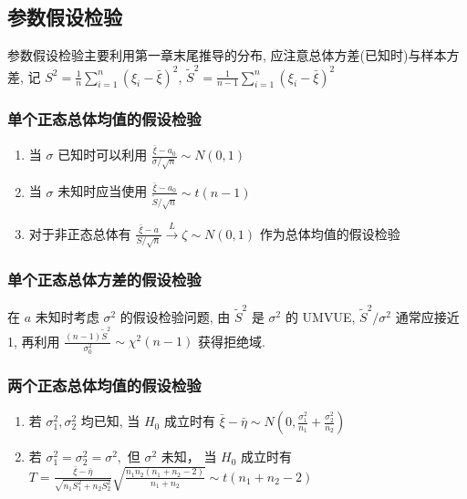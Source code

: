 \documentclass[10pt]{yerbaformat}
\begin{document}
\subsection{参数假设检验}

\par 参数假设检验主要利用第一章末尾推导的分布, 应注意总体方差(已知时)与样本方差, 记 $S^{2}=\frac{1}{n} \sum_{i=1}^{n}\left(\xi_{i}-\bar{\xi}\right)^{2}$, $\tilde{S}^{2}=\frac{1}{n-1} \sum_{i=1}^{n}\left(\xi_{i}-\bar{\xi}\right)^{2}$

\subsubsection{单个正态总体均值的假设检验}

\begin{enumerate}
    \item 当 $\sigma$ 已知时可以利用 $\frac{\bar{\xi}-a_{0}}{\sigma / \sqrt{n}} \sim N(0,1)$
    \item 当 $\sigma$ 未知时应当使用 $\frac{\bar{\xi}-a_{0}}{\tilde{S} / \sqrt{n}} \sim t(n-1)$
    \item 对于非正态总体有 $\frac{\bar{\xi}-a}{S / \sqrt{n}} \stackrel{L}{\rightarrow} \zeta \sim N(0,1)$ 作为总体均值的假设检验
\end{enumerate} 


\subsubsection{单个正态总体方差的假设检验}

\par 在 $a$ 未知时考虑 $\sigma^{2}$ 的假设检验问题, 由 $\tilde{S}^{2}$ 是 $\sigma^{2}$ 的 UMVUE, $\tilde{S}^{2} / \sigma^{2}$ 通常应接近1, 再利用 $\frac{(n-1) \tilde{S}^{2}}{\sigma_{0}^{2}} \sim \chi^{2}(n-1)$ 获得拒绝域.

\subsubsection{两个正态总体均值的假设检验}

\begin{enumerate}
    \item 若 $\sigma_{1}^{2}, \sigma_{2}^{2}$ 均已知, 当 $H_{0}$ 成立时有 $\bar{\xi}-\bar{\eta} \sim N\left(0, \frac{\sigma_{1}^{2}}{n_{1}}+\frac{\sigma_{2}^{2}}{n_{2}}\right)$
    \item 若 $\sigma_{1}^{2}=\sigma_{2}^{2}=\sigma^{2},$ 但 $\sigma^{2}$ 未知， 当 $H_{0}$ 成立时有 $T=\frac{\bar{\xi}-\bar{\eta}}{\sqrt{n_{1} S_{1}^{2}+n_{2} S_{2}^{2}}} \sqrt{\frac{n_{1} n_{2}\left(n_{1}+n_{2}-2\right)}{n_{1}+n_{2}}} \sim t\left(n_{1}+n_{2}-2\right)$
\end{enumerate}
\end{document}
